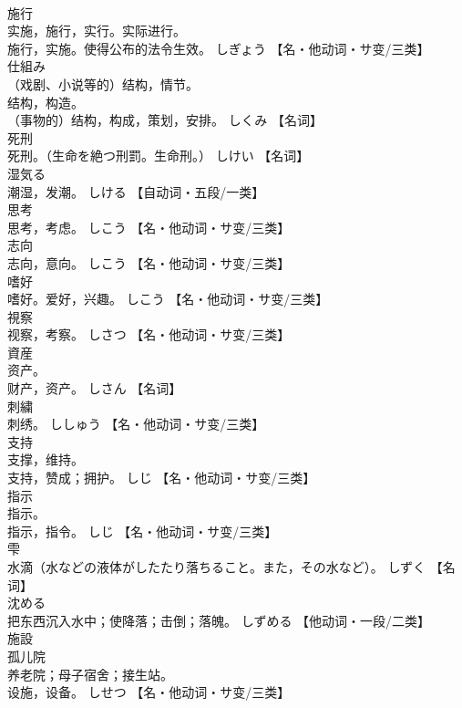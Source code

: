 \documentclass[8pt]{extreport}
\begin{document}
\begin{CJK}{UTF8}{min}
\\	施行	
\\	实施，施行，实行。实际进行。 
\\	施行，实施。使得公布的法令生效。	しぎょう		【名・他动词・サ变/三类】
\\	仕組み	
\\	（戏剧、小说等的）结构，情节。 
\\	结构，构造。 
\\	（事物的）结构，构成，策划，安排。	しくみ		【名词】
\\	死刑	
\\	死刑。（生命を絶つ刑罰。生命刑。）	しけい		【名词】
\\	湿気る	
\\	潮湿，发潮。	しける		【自动词・五段/一类】
\\	思考	
\\	思考，考虑。	しこう		【名・他动词・サ变/三类】
\\	志向	
\\	志向，意向。	しこう		【名・他动词・サ变/三类】
\\	嗜好	
\\	嗜好。爱好，兴趣。	しこう		【名・他动词・サ变/三类】
\\	視察	
\\	视察，考察。	しさつ		【名・他动词・サ变/三类】
\\	資産	
\\	资产。 
\\	财产，资产。	しさん		【名词】
\\	刺繍	
\\	刺绣。	ししゅう		【名・他动词・サ变/三类】
\\	支持	
\\	支撑，维持。 
\\	支持，赞成；拥护。	しじ		【名・他动词・サ变/三类】
\\	指示	
\\	指示。 
\\	指示，指令。	しじ		【名・他动词・サ变/三类】
\\	雫	
\\	水滴（水などの液体がしたたり落ちること。また，その水など）。	しずく		【名词】
\\	沈める	
\\	把东西沉入水中；使降落；击倒；落魄。	しずめる		【他动词・一段/二类】
\\	施設	
\\	孤儿院
\\	养老院；母子宿舍；接生站。 
\\	设施，设备。	しせつ		【名・他动词・サ变/三类】

\end{CJK}
\end{document}
